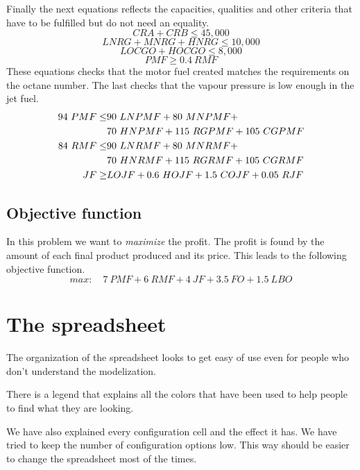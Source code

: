 \documentclass[12pt,a4paper]{report}
\begin{document}
Finally the next equations reflects the capacities, qualities and other criteria that have to be fulfilled but do not need an equality.
\begin{equation}
CRA + CRB \leq 45,000
\end{equation}
\begin{equation}
LNRG + MNRG + HNRG \leq 10,000
\end{equation}
\begin{equation}
LOCGO + HOCGO \leq 8,000
\end{equation}
\begin{equation}
PMF \geq 0.4\ RMF
\end{equation}
These equations checks that the motor fuel created matches the requirements on the octane number. The last checks that the vapour pressure is low enough in the jet fuel.
\begin{align}
94\ PMF \leq & 90\ LNPMF + 80\ MNPMF + \notag\\
             & 70\ HNPMF + 115\ RGPMF + 105\ CGPMF\\
84\ RMF \leq & 90\ LNRMF + 80\ MNRMF + \notag\\
             & 70\ HNRMF + 115\ RGRMF + 105\ CGRMF\\
JF    \geq &LOJF + 0.6\ HOJF + 1.5\ COJF + 0.05\ RJF
\end{align}
\subsection{Objective function}
In this problem we want to \textit{maximize} the profit. The profit is found
by the amount of each final product produced and its price. This leads to the following
objective function.
\begin{equation}
max:\quad 7\ PMF + 6\ RMF + 4\ JF + 3.5\ FO + 1.5\ LBO
\end{equation}

\section{The spreadsheet}
The organization of the spreadsheet looks to get easy of use even for people who don't understand the modelization. 

There is a legend that explains all the colors that have been used to help people to find what they are looking.

We have also explained every configuration cell and the effect it has. We have tried to keep the number of configuration options low. This way should be easier to change the spreadsheet most of the times.
\end{document}
